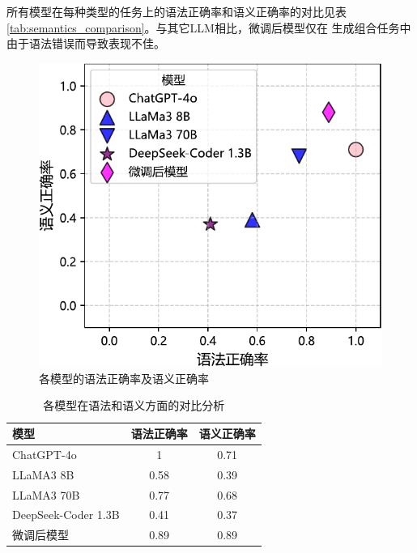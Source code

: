 所有模型在每种类型的任务上的语法正确率和语义正确率的对比见表\ref{tab:semantics_comparison}。与其它LLM相比，微调后模型仅在
生成组合任务中由于语法错误而导致表现不佳。
\begin{figure}
    \centering
    \includegraphics{figures/synatics_and_semantics-crop.pdf}
    \caption{各模型的语法正确率及语义正确率}
    \label{fig:syntactics_and_semantics}
\end{figure}
\begin{table}
    \centering
    \begin{tabular}{lcc}
        \toprule
        \textbf{模型} & \textbf{语法正确率} & \textbf{语义正确率} \\
        \midrule
        ChatGPT-4o & 1 & 0.71 \\
        LLaMA3 8B & 0.58 & 0.39 \\
        LLaMA3 70B & 0.77 & 0.68 \\
        DeepSeek-Coder 1.3B & 0.41 & 0.37 \\
        \midrule
        微调后模型 & 0.89 & 0.89 \\
        \bottomrule
    \end{tabular}
    \caption{各模型在语法和语义方面的对比分析}
    \label{fig:overall_syntactics_semantics}
\end{table}
